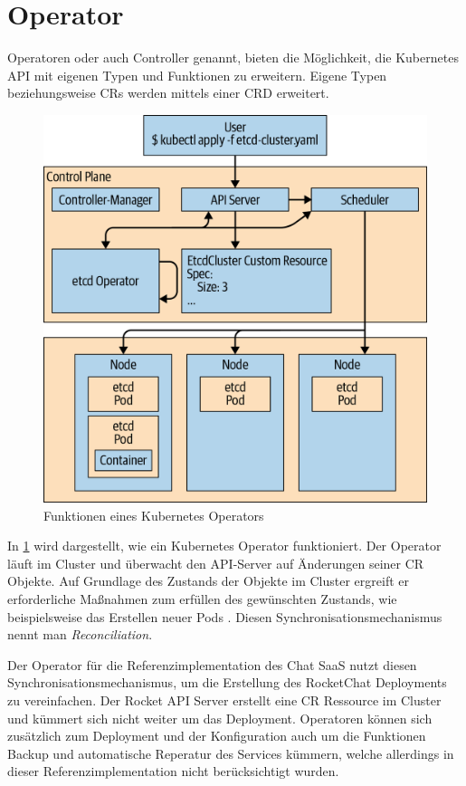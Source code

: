 \section{Operator}
\label{sec:komponenten:operator}

Operatoren oder auch Controller genannt, bieten die Möglichkeit, die Kubernetes API mit eigenen Typen und Funktionen zu erweitern.
Eigene Typen beziehungsweise \acp{CR} werden mittels einer \ac{CRD} erweitert.
\begin{figure}[h]
  \centering
  \includegraphics{gfx/chapters/3_komponenten/operator_example.png}
  \caption{Funktionen eines Kubernetes Operators}
  \label{fig:kubernetes_operator_example}
\end{figure}

In \ref{fig:kubernetes_operator_example} wird dargestellt, wie ein Kubernetes Operator funktioniert. Der Operator läuft im Cluster und
überwacht den API-Server auf Änderungen seiner \ac{CR} Objekte. 
Auf Grundlage des Zustands der Objekte im Cluster ergreift er erforderliche Maßnahmen zum erfüllen des gewünschten Zustands, 
wie beispielsweise das Erstellen neuer Pods \cite{Dobies2020}.
Diesen Synchronisationsmechanismus nennt man \emph{Reconciliation}.

Der Operator für die Referenzimplementation des Chat \ac{SaaS} nutzt diesen Synchronisationsmechanismus, um die Erstellung des RocketChat
Deployments zu vereinfachen. Der Rocket API Server erstellt eine \ac{CR} Ressource im Cluster und kümmert sich nicht weiter um 
das Deployment. Operatoren können sich zusätzlich zum Deployment und der Konfiguration auch um die Funktionen Backup 
und automatische Reperatur des Services kümmern\cite{Dobies2020}, welche allerdings in dieser Referenzimplementation 
nicht berücksichtigt wurden.


